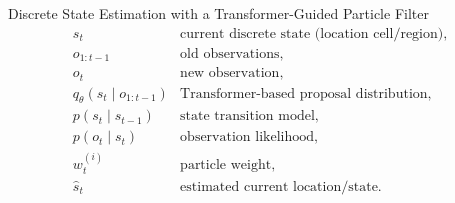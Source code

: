 \begin{frame}{Discrete State Estimation with a Transformer-Guided Particle Filter}
        \[
            \begin{array}{ll}
                s_t & \text{current discrete state (location cell/region)}, \\
                o_{1:t-1} & \text{old observations}, \\
                o_t & \text{new observation}, \\
                q_{\theta}(s_t \mid o_{1:t-1}) & \text{Transformer-based proposal distribution}, \\
                p(s_t \mid s_{t-1}) & \text{state transition model}, \\
                p(o_t \mid s_t) & \text{observation likelihood}, \\
                w_t^{(i)} & \text{particle weight}, \\
                \hat{s}_t & \text{estimated current location/state}.
            \end{array}
        \]
\end{frame}